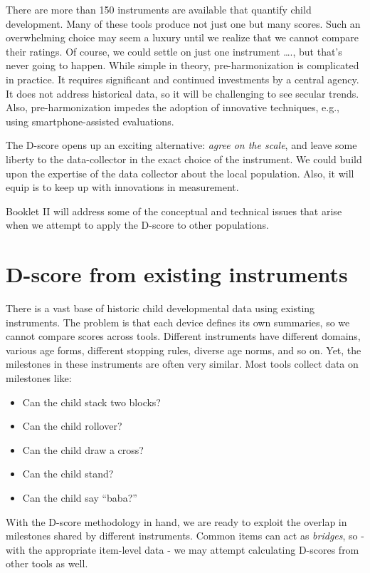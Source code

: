 \documentclass[
]{book}
\providecommand{\tightlist}{%
  \setlength{\itemsep}{0pt}\setlength{\parskip}{0pt}}
\begin{document}
There are more than 150 instruments are available that quantify child development. Many of these tools produce not just one but many scores. Such an overwhelming choice may seem a luxury until we realize that we cannot compare their ratings. Of course, we could settle on just one instrument \ldots., but that's never going to happen. While simple in theory, pre-harmonization is complicated in practice. It requires significant and continued investments by a central agency. It does not address historical data, so it will be challenging to see secular trends. Also, pre-harmonization impedes the adoption of innovative techniques, e.g., using smartphone-assisted evaluations.

The D-score opens up an exciting alternative: \emph{agree on the scale}, and leave some liberty to the data-collector in the exact choice of the instrument. We could build upon the expertise of the data collector about the local population. Also, it will equip is to keep up with innovations in measurement.

Booklet II will address some of the conceptual and technical issues that arise when we attempt to apply the D-score to other populations.

\hypertarget{d-score-from-existing-instruments}{%
\section{D-score from existing instruments}\label{d-score-from-existing-instruments}}

There is a vast base of historic child developmental data using existing instruments. The problem is that each device defines its own summaries, so we cannot compare scores across tools. Different instruments have different domains, various age forms, different stopping rules, diverse age norms, and so on. Yet, the milestones in these instruments are often very similar. Most tools collect data on milestones like:

\begin{itemize}
\tightlist
\item
  Can the child stack two blocks?
\item
  Can the child rollover?
\item
  Can the child draw a cross?
\item
  Can the child stand?
\item
  Can the child say ``baba?''
\end{itemize}

With the D-score methodology in hand, we are ready to exploit the overlap in milestones shared by different instruments. Common items can act as \emph{bridges}, so - with the appropriate item-level data - we may attempt calculating D-scores from other tools as well.
\end{document}
